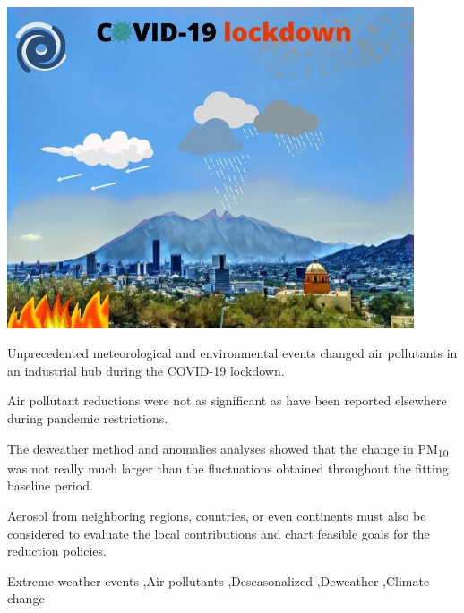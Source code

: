 \documentclass[preprint,12pt]{elsarticle}
\begin{document}
\begin{frontmatter}
\begin{abstract}
	\end{abstract}
	\begin{graphicalabstract}
		\includegraphics[width=12cm]{COVID-19_lockdown.jpg}
	\end{graphicalabstract}
	\begin{highlights}
		\item Unprecedented meteorological and environmental events changed air pollutants in an industrial hub during the COVID-19 lockdown.
		\item Air pollutant reductions were not as significant as have been reported elsewhere during pandemic restrictions.
		\item The deweather method and anomalies analyses showed that the change in PM\textsubscript{10} was not really much larger than the fluctuations obtained throughout the fitting baseline period.
		\item Aerosol from neighboring regions, countries, or even continents must also be considered to evaluate the local contributions and chart feasible goals for the reduction policies.
	\end{highlights}
	\begin{keyword}
		Extreme weather events \sep Air pollutants \sep Deseasonalized \sep Deweather \sep Climate change
	\end{keyword}
\end{frontmatter}
\end{document}
